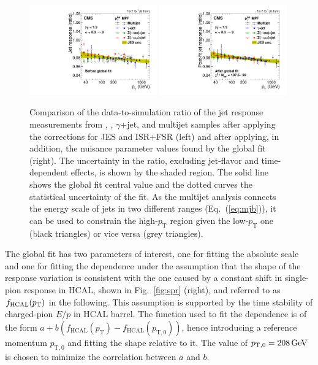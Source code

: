 \documentclass[11pt,twoside,a4paper,cmspaper,final,collab]{cms-tdr}
\begin{document}
\begin{figure}[htbp!]
\includegraphics[width=0.49\textwidth]{Figure_024-a.pdf}
\includegraphics[width=0.49\textwidth]{Figure_024-b.pdf}
\caption{\label{fig:abspt}
Comparison of the data-to-simulation ratio of the jet response measurements from \zmmjet, \zeejet, $\gamma$+jet, and multijet samples after applying the corrections for JES and ISR+FSR (left) and after applying, in addition, the nuisance parameter values found by the global fit (right). The uncertainty in the ratio, excluding jet-flavor and time-dependent effects, is shown by the shaded region.  The solid line shows the global fit central value and the dotted curves the statistical uncertainty of the fit. As the multijet analysis connects the energy scale of jets in two different \pt ranges (Eq.~(\ref{eq:mjb})), it can be used to constrain the high-$p_\mathrm{T}$ region given the low-$p_\mathrm{T}$ one (black triangles) or vice versa (grey triangles).
}
\end{figure}

The global fit has two parameters of interest,
one for fitting the absolute scale and one for fitting the \pt dependence under the assumption that the shape of the response variation is consistent with the one caused by a constant shift in single-pion response in HCAL, shown in Fig.~\ref{fig:spr} (right), and referred to as $f_\mathrm{HCAL}(p_{\mathrm{T}})$ in the following.
This assumption is supported by the time stability
of charged-pion $E/p$ in HCAL barrel.
The function used to fit the \pt dependence is of the form $a + b(f_\mathrm{HCAL}(p_{\mathrm{T}})-f_\mathrm{HCAL}(p_{\mathrm{T},0}))$, hence introducing a reference momentum $p_{\mathrm{T},0}$ and fitting the shape relative to it. The value of $p_{\mathrm{T},0}=208\,\text{Ge\hspace{-.08em}V}$ is chosen to minimize the correlation between $a$ and $b$.
\end{document}
